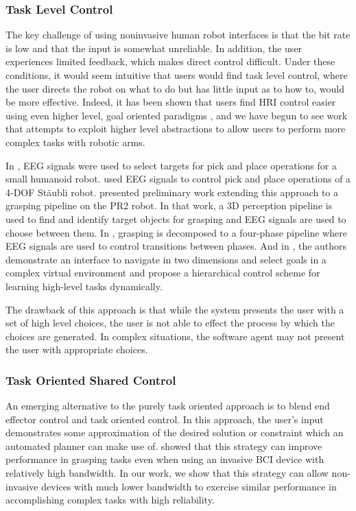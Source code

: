 \subsubsection{Task Level Control}
The key challenge of using noninvasive human robot interfaces is that the bit rate is low and that the input is somewhat unreliable. In addition, the user experiences limited feedback, which makes direct control difficult.  Under these conditions, it would seem intuitive that users would find task level control, where the user directs the robot on what to do but has little input as to how to, would be more effective. Indeed,  it has been shown that users find HRI control easier using even higher level, goal oriented paradigms \cite{Royer2011}, and we have begun to see work that attempts to exploit higher level abstractions to allow users to perform more complex tasks with robotic arms. 

In \cite{Bell2008}, EEG signals were used to select targets for pick and place operations for a small humanoid robot. \cite{Waytowich} used EEG signals to control pick and place operations of a 4-DOF St\"{a}ubli robot. \cite{M.BryanV.ThomasG.NicollL.Chang2011} presented preliminary work extending this approach to a grasping pipeline on the PR2 robot. In that work, a 3D perception pipeline is used to find and identify target objects for grasping and EEG signals are used to choose between them. In \cite{Muller-Putz2005}, grasping is decomposed to a four-phase pipeline where EEG signals are used to control transitions between phases. And in \cite{Scherer2011a}, the authors demonstrate an interface to navigate in two dimensions and select goals in a complex virtual environment and propose a hierarchical control scheme for learning high-level tasks dynamically. 

The drawback of this approach is that while the system presents the user with a set of high level choices, the user is not able to effect the process by which the choices are generated. In complex situations, the software agent may not present the user with appropriate choices. 

\subsubsection{Task Oriented Shared Control}
An emerging alternative to the purely task oriented approach is to blend end effector control and task oriented control. In this approach, the user's input demonstrates some approximation of the desired solution or constraint which an automated planner can make use of. \cite{Mulling2015} showed that this strategy can improve performance in grasping tasks even when using an invasive BCI device with relatively high bandwidth. In our work, we show that this strategy can allow non-invasive devices with much lower bandwidth to exercise similar performance in accomplishing complex tasks with high reliability. 

